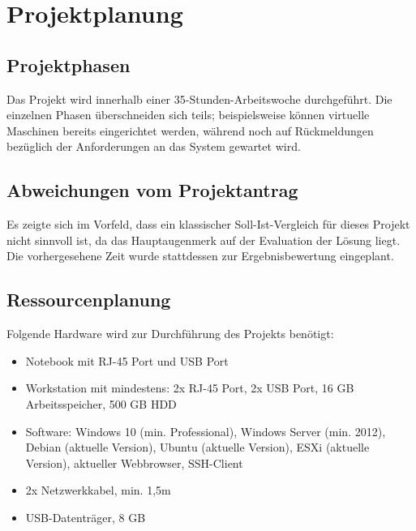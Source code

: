 \section{Projektplanung} 
\label{sec:Projektplanung}

\subsection{Projektphasen}
\label{sec:Projektphasen}
Das Projekt wird innerhalb einer 35-Stunden-Arbeitswoche durchgeführt. Die einzelnen Phasen überschneiden sich teils; beispielsweise können virtuelle Maschinen bereits eingerichtet werden, während noch auf Rückmeldungen bezüglich der Anforderungen an das System gewartet wird. 

\subsection{Abweichungen vom Projektantrag}
\label{sec:AbweichungenProjektantrag}
Es zeigte sich im Vorfeld, dass ein klassischer Soll-Ist-Vergleich für dieses Projekt nicht sinnvoll ist, da das Hauptaugenmerk auf der Evaluation der Lösung liegt. Die vorhergesehene Zeit wurde stattdessen zur Ergebnisbewertung eingeplant.

\subsection{Ressourcenplanung}
\label{sec:Ressourcenplanung}
Folgende Hardware wird zur Durchführung des Projekts benötigt:
\begin{itemize}
  \item Notebook mit RJ-45 Port und USB Port
  \item Workstation mit mindestens: 2x RJ-45 Port, 2x USB Port, 16 GB Arbeitsspeicher, 500 GB HDD
  \item Software: Windows 10 (min. Professional), Windows Server (min. 2012), Debian (aktuelle Version), Ubuntu (aktuelle Version), ESXi (aktuelle Version), aktueller Webbrowser, SSH-Client
  \item 2x Netzwerkkabel, min. 1,5m
  \item USB-Datenträger, 8 GB
\end{itemize}
